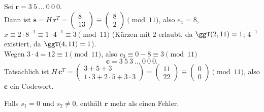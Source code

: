 \begin{beispiel}
Sei $\mathbf{r} = 3\ 5\ \dots\ 0\ 0\ 0$.\\
Dann ist $\mathbf{s} = H\,\mathbf{r}^T = \begin{pmatrix} 8\\ 13 \end{pmatrix} \equiv \begin{pmatrix} 8\\ 2 \end{pmatrix} \pmod{11}$, also $e_x = 8$,
$x \equiv 2 \cdot 8^{-1} \equiv 1 \cdot 4^{-1} \equiv 3 \pmod{11}$
(Kürzen mit $2$ erlaubt, da $\ggT(2, 11) = 1$; $4^{-1}$ existiert, da $\ggT(4, 11) = 1$).\\
Wegen $3 \cdot 4 = 12 \equiv 1 \pmod{11}$, also $c_3 \equiv 0 - 8 \equiv 3 \pmod{11}$
\[ \mathbf{c} = 3\ 5\ 3\ \dots\ 0\ 0\ 0. \]
Tatsächlich ist $H\,\mathbf{c}^T = \begin{pmatrix} 3+5+3\\ 1\cdot 3 + 2\cdot 5 + 3\cdot 3 \end{pmatrix} = \begin{pmatrix} 11\\ 22 \end{pmatrix} \equiv \begin{pmatrix} 0\\ 0 \end{pmatrix} \pmod{11}$, also $\mathbf{c}$ ein Codewort.
\end{beispiel}

\begin{bemerkung}
Falls $s_1 = 0$ und $s_2 \neq 0$, enthält $\mathbf{r}$ mehr als einen Fehler.
\end{bemerkung}
